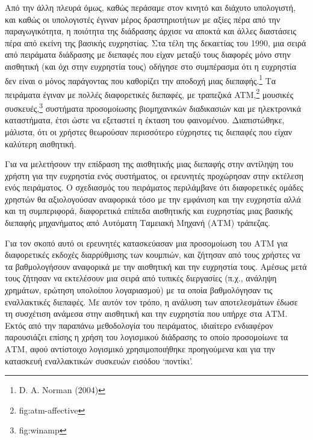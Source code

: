 \documentclass[
]{article}
\begin{document}
Από την άλλη πλευρά όμως, καθώς περάσαμε στον κινητό και διάχυτο
υπολογιστή, και καθώς οι υπολογιστές έγιναν μέρος δραστηριοτήτων με
αξίες πέρα από την παραγωγικότητα, η ποιότητα της διάδρασης άρχισε να
αποκτά και άλλες διαστάσεις πέρα από εκείνη της βασικής ευχρηστίας. Στα
τέλη της δεκαετίας του 1990, μια σειρά από πειράματα διάδρασης με
διεπαφές που είχαν μεταξύ τους διαφορές μόνο στην αισθητική (και όχι
στην ευχρηστία τους) οδήγησε στο συμπέρασμα ότι η ευχρηστία δεν είναι ο
μόνος παράγοντας που καθορίζει την αποδοχή μιας διεπαφής.\footnote{D. A.
  Norman (2004)} Τα πειράματα έγιναν με πολλές διαφορετικές διεπαφές, με
τραπεζικά ATM,\footnote{fig:atm-affective} μουσικές συσκευές,\footnote{fig:winamp}
συστήματα προσομοίωσης βιομηχανικών διαδικασιών και με ηλεκτρονικά
καταστήματα, έτσι ώστε να εξεταστεί η έκταση του φαινομένου.
Διαπιστώθηκε, μάλιστα, ότι οι χρήστες θεωρούσαν περισσότερο εύχρηστες
τις διεπαφές που είχαν καλύτερη αισθητική.

Για να μελετήσουν την επίδραση της αισθητικής μιας διεπαφής στην
αντίληψη του χρήστη για την ευχρηστία ενός συστήματος, οι ερευνητές
προχώρησαν στην εκτέλεση ενός πειράματος. Ο σχεδιασμός του πειράματος
περιλάμβανε ότι διαφορετικές ομάδες χρηστών θα αξιολογούσαν αναφορικά
τόσο με την εμφάνιση και την ευχρηστία αλλά και τη συμπεριφορά,
διαφορετικά επίπεδα αισθητικής και ευχρηστίας μιας βασικής διεπαφής
μηχανήματος από Αυτόματη Ταμειακή Μηχανή (ΑΤΜ) τράπεζας.

Για τον σκοπό αυτό οι ερευνητές κατασκεύασαν μια προσομοίωση του ΑΤΜ για
διαφορετικές εκδοχές διαρρύθμισης των κουμπιών, και ζήτησαν από τους
χρήστες να τα βαθμολογήσουν αναφορικά με την αισθητική και την ευχρηστία
τους. Αμέσως μετά τους ζήτησαν να εκτελέσουν μια σειρά από τυπικές
διεργασίες (π.χ., ανάληψη χρημάτων, ερώτηση υπολοίπου λογαριασμού) με τα
οποία βαθμολόγησαν τις εναλλακτικές διεπαφές. Με αυτόν τον τρόπο, η
ανάλυση των αποτελεσμάτων έδωσε τη συσχέτιση ανάμεσα στην αισθητική και
την ευχρηστία που υπήρχε στα ΑΤΜ. Εκτός από την παραπάνω μεθοδολογία του
πειράματος, ιδιαίτερο ενδιαφέρον παρουσιάζει επίσης η χρήση του
λογισμικού διάδρασης το οποίο προσομοίωνε τα ΑΤΜ, αφού αντίστοιχο
λογισμικό χρησιμοποιήθηκε προηγούμενα και για την κατασκευή εναλλακτικών
συσκευών εισόδου `ποντίκι'.
\end{document}
